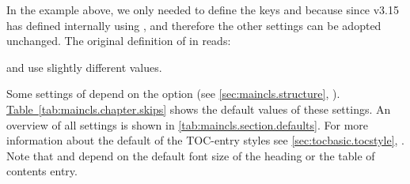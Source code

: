 In the example above, we only needed to define the keys 
and  because since v3.15 \KOMAScript{} has defined
 internally using
, and therefore the other settings can be adopted
unchanged. The original definition of  in
 reads:
\begin{lstcode}
\end{lstcode}
 and  use slightly different values.

Some settings of  depend on the
 option (see \autoref{sec:maincls.structure},
).
\hyperref[tab:maincls.chapter.skips]{Table~\ref*{tab:maincls.chapter.skips}}
shows the default values of these settings. An overview of all settings is
shown in \autoref{tab:maincls.section.defaults}. For more
information about the default of the TOC-entry styles see
\autoref{sec:tocbasic.tocstyle},
. Note that \PValue{1ex} and
 depend on the default font size of the heading or the
table of contents entry.%

